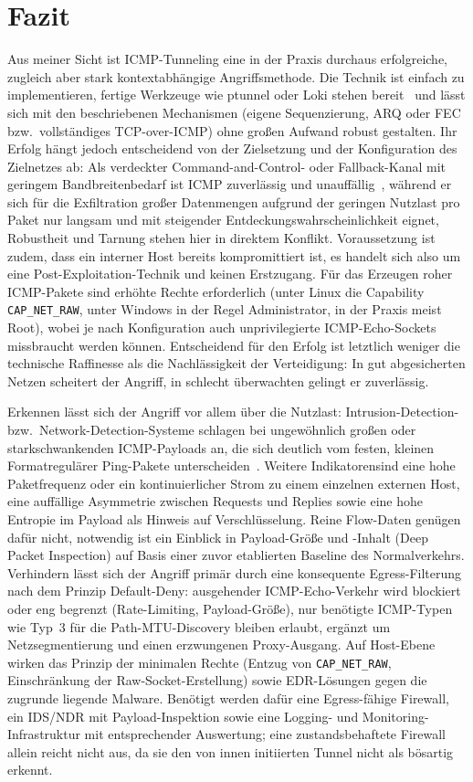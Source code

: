 \documentclass[11pt,a4paper]{article}
\begin{document}
\section{Fazit}
Aus meiner Sicht ist ICMP-Tunneling eine in der Praxis durchaus erfolgreiche,
zugleich aber stark kontextabhängige Angriffsmethode. Die Technik ist einfach zu
implementieren, fertige Werkzeuge wie ptunnel oder Loki stehen
bereit~\cite{loki} und lässt sich mit den beschriebenen Mechanismen (eigene
Sequenzierung, ARQ oder FEC bzw.\ vollständiges TCP-over-ICMP) ohne großen
Aufwand robust gestalten. Ihr Erfolg hängt jedoch entscheidend von der
Zielsetzung und der Konfiguration des Zielnetzes ab: Als verdeckter
Command-and-Control- oder Fallback-Kanal mit geringem Bandbreitenbedarf ist ICMP
zuverlässig und unauffällig~\cite{mitreT1095}, während er sich für die
Exfiltration großer Datenmengen aufgrund der geringen Nutzlast pro Paket nur
langsam und mit steigender Entdeckungswahrscheinlichkeit eignet, Robustheit und
Tarnung stehen hier in direktem Konflikt. Voraussetzung ist zudem, dass ein
interner Host bereits kompromittiert ist, es handelt sich also um eine
Post-Exploitation-Technik und keinen Erstzugang. Für das Erzeugen roher
ICMP-Pakete sind erhöhte Rechte erforderlich (unter Linux die Capability
\texttt{CAP\_NET\_RAW}, unter Windows in der Regel Administrator, in der Praxis
meist Root), wobei je nach Konfiguration auch unprivilegierte ICMP-Echo-Sockets
missbraucht werden können. Entscheidend für den Erfolg ist letztlich weniger die
technische Raffinesse als die Nachlässigkeit der Verteidigung: In gut
abgesicherten Netzen scheitert der Angriff, in schlecht überwachten gelingt er
zuverlässig.
 
Erkennen lässt sich der Angriff vor allem über die Nutzlast:
Intrusion-Detection- bzw.\ Network-Detection-Systeme schlagen bei ungewöhnlich
großen oder starkschwankenden ICMP-Payloads an, die sich deutlich vom festen,
kleinen Formatregulärer Ping-Pakete unterscheiden~\cite{elastic, vectra}.
Weitere Indikatorensind eine hohe Paketfrequenz oder ein kontinuierlicher Strom zu einem einzelnen
externen Host, eine auffällige Asymmetrie zwischen Requests und Replies sowie
eine hohe Entropie im Payload als Hinweis auf Verschlüsselung. Reine Flow-Daten
genügen dafür nicht, notwendig ist ein Einblick in Payload-Größe und -Inhalt
(Deep Packet Inspection) auf Basis einer zuvor etablierten Baseline des
Normalverkehrs. Verhindern lässt sich der Angriff primär durch eine konsequente
Egress-Filterung nach dem Prinzip Default-Deny: ausgehender ICMP-Echo-Verkehr
wird blockiert oder eng begrenzt (Rate-Limiting, Payload-Größe), nur benötigte
ICMP-Typen wie Typ~3 für die Path-MTU-Discovery bleiben erlaubt, ergänzt um
Netzsegmentierung und einen erzwungenen Proxy-Ausgang. Auf Host-Ebene wirken das
Prinzip der minimalen Rechte (Entzug von \texttt{CAP\_NET\_RAW}, Einschränkung
der Raw-Socket-Erstellung) sowie EDR-Lösungen gegen die zugrunde liegende
Malware. Benötigt werden dafür eine Egress-fähige Firewall, ein IDS/NDR mit
Payload-Inspektion sowie eine Logging- und Monitoring-Infrastruktur mit
entsprechender Auswertung; eine zustandsbehaftete Firewall allein reicht nicht
aus, da sie den von innen initiierten Tunnel nicht als bösartig erkennt.
 
\end{document}
